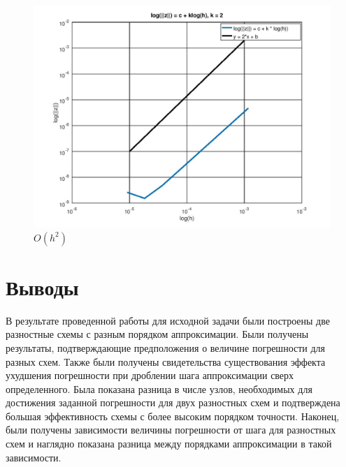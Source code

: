 \documentclass[12pt]{article}
\begin{document}
\begin{figure}[ht]
\begin{center}
\includegraphics[width=\linewidth]{loglog2.jpg} 
\end{center}
\caption{$O(h^2)$}
\end{figure}

\pagebreak

\section{Выводы}

В результате проведенной работы для исходной задачи были построены две разностные схемы с разным порядком аппроксимации. Были получены результаты, подтверждающие предположения о величине погрешности для разных схем. Также были получены свидетельства существования эффекта ухудшения погрешности при дроблении шага аппроксимации сверх определенного. Была показана разница в числе узлов, необходимых для достижения заданной погрешности для двух разностных схем и подтверждена большая эффективность схемы с более высоким порядком точности. Наконец, были получены зависимости величины погрешности от шага для разностных схем и наглядно показана разница между порядками аппроксимации в такой зависимости.
\end{document}
